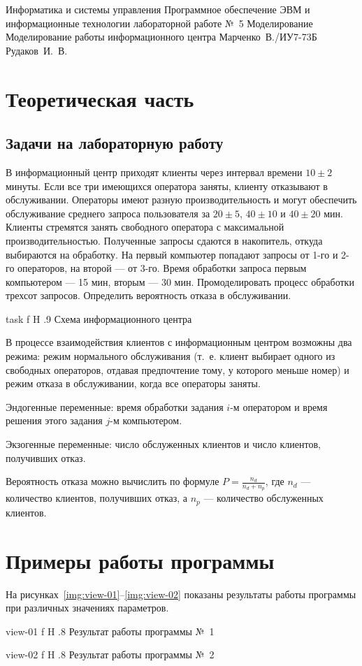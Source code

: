 \documentclass{bmstu}
\begin{document}
\makereporttitle
    {Информатика и системы управления}
    {Программное обеспечение ЭВМ и информационные технологии}
    {лабораторной работе №~5}
    {Моделирование}
    {Моделирование работы информационного центра}
    {}
    {Марченко~В./ИУ7-73Б} %
    {Рудаков~И.~В.}

{\centering \maketableofcontents}

\chapter{Теоретическая часть}

\section{Задачи на лабораторную работу}

В информационный центр приходят клиенты через интервал времени $10 \pm 2$ минуты. 
Если все три имеющихся оператора заняты, клиенту отказывают в обслуживании. 
Операторы имеют разную производительность и могут обеспечить обслуживание среднего запроса пользователя за $20 \pm 5$, $40 \pm 10$ и $40 \pm 20$ мин. 
Клиенты стремятся занять свободного оператора с максимальной производительностью. 
Полученные запросы сдаются в накопитель, откуда выбираются на обработку. 
На первый компьютер попадают запросы от 1-го и 2-го операторов, на второй --- от 3-го. 
Время обработки запроса первым компьютером --- 15 мин, вторым --- 30 мин. 
Промоделировать процесс обработки трехсот запросов. 
Определить вероятность отказа в обслуживании.

    {task}
    {f}
    {H}
    {.9\textwidth}
    {Схема информационного центра}

В процессе взаимодействия клиентов с информационным центром возможны два режима: режим нормального обслуживания (т.~е. клиент выбирает одного из свободных операторов, отдавая предпочтение тому, у которого меньше номер) и режим отказа в обслуживании, когда все операторы заняты.

Эндогенные переменные: время обработки задания $i$-м оператором и время решения этого задания $j$-м компьютером.

Экзогенные переменные: число обслуженных клиентов и число клиентов, получивших отказ.

Вероятность отказа можно вычислить по формуле $P = \frac{n_{d}}{n_{d} + n_{p}}$, где $n_{d}$ --- количество клиентов, получивших отказ, а $n_{p}$ --- количество обслуженных клиентов.

\chapter{Примеры работы программы}

На рисунках~\ref{img:view-01}--\ref{img:view-02} показаны результаты работы программы при различных значениях параметров.

    {view-01}
    {f}
    {H}
    {.8\textwidth}
    {Результат работы программы №~1}
    
    {view-02}
    {f}
    {H}
    {.8\textwidth}
    {Результат работы программы №~2}
\end{document}
